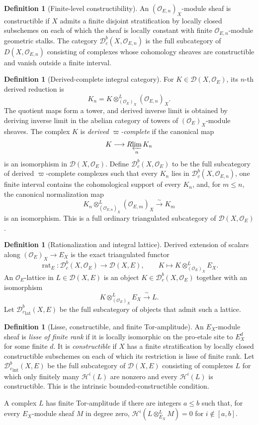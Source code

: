 \documentclass[10pt]{article}
\theoremstyle{definition}
\newtheorem{definition}[theorem]{Definition}
\newcommand{\OO}{\mathcal O}
\newcommand{\Db}{\mathcal D}
\newcommand{\Dbc}{\mathcal D^b_c}
\begin{document}
\begin{definition}[Finite-level constructibility]
An \((\OO_{E,n})_X\)-module sheaf is constructible if \(X\) admits a
finite disjoint stratification by locally closed subschemes on each of which
the sheaf is locally constant with finite \(\OO_{E,n}\)-module geometric
stalks.  The category \(\Dbc(X,\OO_{E,n})\) is the full subcategory of
\(D(X,\OO_{E,n})\) consisting of complexes whose cohomology sheaves are
constructible and vanish outside a finite interval.
\end{definition}

\begin{definition}[Derived-complete integral category]
For \(K\in\Db(X,\OO_E)\), its \(n\)-th derived reduction is
\[
 K_n=K\otimes^L_{(\OO_E)_X}(\OO_{E,n})_X.
\]
The quotient maps form a tower, and derived inverse limit is obtained by
deriving inverse limit in the abelian category of towers of
\((\OO_E)_X\)-module sheaves.  The complex \(K\) is \emph{derived
\(\varpi\)-complete} if the canonical map
\[
 K\longrightarrow R\!\varprojlim_n K_n
\]
is an isomorphism in \(\Db(X,\OO_E)\).  Define
\(\Dbc(X,\OO_E)\) to be the full subcategory of derived
\(\varpi\)-complete complexes such that every
\(K_n\) lies in \(\Dbc(X,\OO_{E,n})\), one finite interval contains the
cohomological support of every \(K_n\), and, for \(m\le n\), the canonical
normalization map
\[
 K_n\otimes^L_{(\OO_{E,n})_X}(\OO_{E,m})_X
 \xrightarrow{\ \sim\ }K_m
\]
is an isomorphism.  This is a full ordinary triangulated subcategory of
\(\Db(X,\OO_E)\).
\end{definition}

\begin{definition}[Rationalization and integral lattice]
Derived extension of scalars along \((\OO_E)_X\to E_X\) is the exact
triangulated functor
\[
 \operatorname{rat}_E:\Dbc(X,\OO_E)\longrightarrow\Db(X,E),
 \qquad K\longmapsto K\otimes^L_{(\OO_E)_X}E_X.
\]
An \(\OO_E\)-lattice in \(L\in\Db(X,E)\) is an object
\(K\in\Dbc(X,\OO_E)\) together with an isomorphism
\[
 K\otimes^L_{(\OO_E)_X}E_X\xrightarrow{\ \sim\ }L.
\]
Let \({\Dbc}_{\mathrm{lat}}(X,E)\) be the full subcategory of objects that
admit such a lattice.
\end{definition}

\begin{definition}[Lisse, constructible, and finite Tor-amplitude]
An \(E_X\)-module sheaf is \emph{lisse of finite rank} if it is locally
isomorphic on the pro-etale site to \(E_X^d\) for some finite \(d\).  It is
\emph{constructible} if \(X\) has a finite stratification by locally closed
constructible subschemes on each of which its restriction is lisse of finite
rank.  Let \({\Dbc}_{\mathrm{int}}(X,E)\) be the full subcategory of
\(\Db(X,E)\) consisting of complexes \(L\) for which only finitely many
\(\mathcal H^i(L)\) are nonzero and every \(\mathcal H^i(L)\) is
constructible.  This is the intrinsic bounded-constructible condition.

A complex \(L\) has finite Tor-amplitude if there are integers \(a\le b\)
such that, for every \(E_X\)-module sheaf \(M\) in degree zero,
\(\mathcal H^i(L\otimes_{E_X}^LM)=0\) for \(i\notin[a,b]\).
\end{definition}
\end{document}
